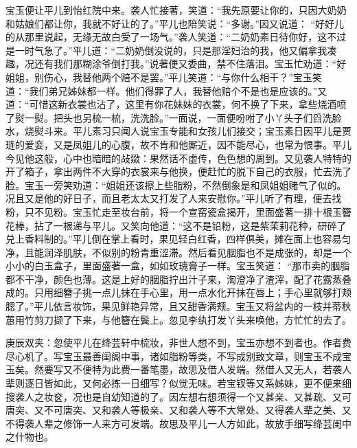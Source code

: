 \begin{parag}
    宝玉便让平儿到怡红院中来。袭人忙接著，笑道：“我先原要让你的，只因大奶奶和姑娘们都让你，我就不好让的了。”平儿也陪笑说：“多谢。”因又说道： “好好儿的从那里说起，无缘无故白受了一场气。”袭人笑道：“二奶奶素日待你好，这不过是一时气急了。”平儿道：“二奶奶倒没说的，只是那淫妇治的我，他又偏拿我凑趣，况还有我们那糊涂爷倒打我。”说著便又委曲，禁不住落泪。宝玉忙劝道：“好姐姐，别伤心，我替他两个赔不是罢。”平儿笑道：“与你什么相干？”宝玉笑道：“我们弟兄姊妹都一样。他们得罪了人，我替他赔个不是也是应该的。”又道：“可惜这新衣裳也沾了，这里有你花妹妹的衣裳，何不换了下来，拿些烧酒喷了熨一熨。把头也另梳一梳，洗洗脸。”一面说，一面便吩咐了小丫头子们舀洗脸水，烧熨斗来。平儿素习只闻人说宝玉专能和女孩儿们接交；宝玉素日因平儿是贾琏的爱妾，又是凤姐儿的心腹，故不肯和他厮近，因不能尽心，也常为恨事。平儿今见他这般，心中也暗暗的敁敠：果然话不虚传，色色想的周到。又见袭人特特的开了箱子，拿出两件不大穿的衣裳来与他换，便赶忙的脱下自己的衣服，忙去洗了脸。宝玉一旁笑劝道：“姐姐还该擦上些脂粉，不然倒象是和凤姐姐赌气了似的。况且又是他的好日子，而且老太太又打发了人来安慰你。”平儿听了有理，便去找粉，只不见粉。宝玉忙走至妆台前，将一个宣窑瓷盒揭开，里面盛著一排十根玉簪花棒，拈了一根递与平儿。又笑向他道：“这不是铅粉，这是紫茉莉花种，研碎了兑上香料制的。”平儿倒在掌上看时，果见轻白红香，四样俱美，摊在面上也容易匀净，且能润泽肌肤，不似别的粉青重涩滞。然后看见胭脂也不是成张的，却是一个小小的白玉盒子，里面盛著一盒，如如玫瑰膏子一样。宝玉笑道： “那市卖的胭脂都不干净，颜色也薄。这是上好的胭脂拧出汁子来，淘澄净了渣滓，配了花露蒸叠成的。只用细簪子挑一点儿抹在手心里，用一点水化开抹在唇上；手心里就够打颊腮了。”平儿依言妆饰，果见鲜艳异常，且又甜香满颊。宝玉又将盆内的一枝并蒂秋蕙用竹剪刀撷了下来，与他簪在鬓上。忽见李纨打发丫头来唤他，方忙忙的去了。\begin{note}庚辰双夹：忽使平儿在绛芸轩中梳妆，非世人想不到，宝玉亦想不到者也。作者费尽心机了。写宝玉最善闺阁中事，诸如脂粉等类，不写成别致文章，则宝玉不成宝玉矣。然要写又不便特为此费一番笔墨，故思及借人发端。然借人又无人，若袭人辈则逐日皆如此，又何必拣一日细写？似觉无味。若宝钗等又系姊妹，更不便来细搜袭人之妆奁，况也是自幼知道的了。因左想右想须得一个又甚亲、又甚疏、又可唐突、又不可唐突、又和袭人等极亲、又和袭人等不大常处、又得袭人辈之美、又不得袭人辈之修饰一人来方可发端。故思及平儿一人方如此，故放手细写绛芸闺中之什物也。\end{note}
\end{parag}


